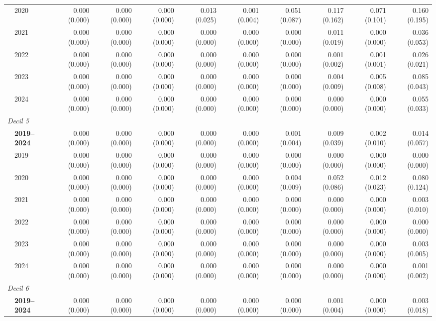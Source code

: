 \begin{table}[htbp]
\begin{tabular}{llrrrrrrrrr}
 & 2020 & 0.000 (0.000) & 0.000 (0.000) & 0.000 (0.000) & 0.013 (0.025) & 0.001 (0.004) & 0.051 (0.087) & 0.117 (0.162) & 0.071 (0.101) & 0.160 (0.195) \\
 & 2021 & 0.000 (0.000) & 0.000 (0.000) & 0.000 (0.000) & 0.000 (0.000) & 0.000 (0.000) & 0.000 (0.000) & 0.011 (0.019) & 0.000 (0.000) & 0.036 (0.053) \\
 & 2022 & 0.000 (0.000) & 0.000 (0.000) & 0.000 (0.000) & 0.000 (0.000) & 0.000 (0.000) & 0.000 (0.000) & 0.001 (0.002) & 0.001 (0.001) & 0.026 (0.021) \\
 & 2023 & 0.000 (0.000) & 0.000 (0.000) & 0.000 (0.000) & 0.000 (0.000) & 0.000 (0.000) & 0.000 (0.000) & 0.004 (0.009) & 0.005 (0.008) & 0.085 (0.043) \\
 & 2024 & 0.000 (0.000) & 0.000 (0.000) & 0.000 (0.000) & 0.000 (0.000) & 0.000 (0.000) & 0.000 (0.000) & 0.000 (0.000) & 0.000 (0.000) & 0.055 (0.033) \\
\midrule
\multicolumn{11}{l}{\textit{Decil 5}} \\
 & \textbf{2019–2024} & 0.000 (0.000) & 0.000 (0.000) & 0.000 (0.000) & 0.000 (0.000) & 0.000 (0.000) & 0.001 (0.004) & 0.009 (0.039) & 0.002 (0.010) & 0.014 (0.057) \\
 & 2019 & 0.000 (0.000) & 0.000 (0.000) & 0.000 (0.000) & 0.000 (0.000) & 0.000 (0.000) & 0.000 (0.000) & 0.000 (0.000) & 0.000 (0.000) & 0.000 (0.000) \\
 & 2020 & 0.000 (0.000) & 0.000 (0.000) & 0.000 (0.000) & 0.000 (0.000) & 0.000 (0.000) & 0.004 (0.009) & 0.052 (0.086) & 0.012 (0.023) & 0.080 (0.124) \\
 & 2021 & 0.000 (0.000) & 0.000 (0.000) & 0.000 (0.000) & 0.000 (0.000) & 0.000 (0.000) & 0.000 (0.000) & 0.000 (0.000) & 0.000 (0.000) & 0.003 (0.010) \\
 & 2022 & 0.000 (0.000) & 0.000 (0.000) & 0.000 (0.000) & 0.000 (0.000) & 0.000 (0.000) & 0.000 (0.000) & 0.000 (0.000) & 0.000 (0.000) & 0.000 (0.000) \\
 & 2023 & 0.000 (0.000) & 0.000 (0.000) & 0.000 (0.000) & 0.000 (0.000) & 0.000 (0.000) & 0.000 (0.000) & 0.000 (0.000) & 0.000 (0.000) & 0.003 (0.005) \\
 & 2024 & 0.000 (0.000) & 0.000 (0.000) & 0.000 (0.000) & 0.000 (0.000) & 0.000 (0.000) & 0.000 (0.000) & 0.000 (0.000) & 0.000 (0.000) & 0.001 (0.002) \\
\midrule
\multicolumn{11}{l}{\textit{Decil 6}} \\
 & \textbf{2019–2024} & 0.000 (0.000) & 0.000 (0.000) & 0.000 (0.000) & 0.000 (0.000) & 0.000 (0.000) & 0.000 (0.000) & 0.001 (0.004) & 0.000 (0.000) & 0.003 (0.018) \\

\end{tabular}
\end{table}
